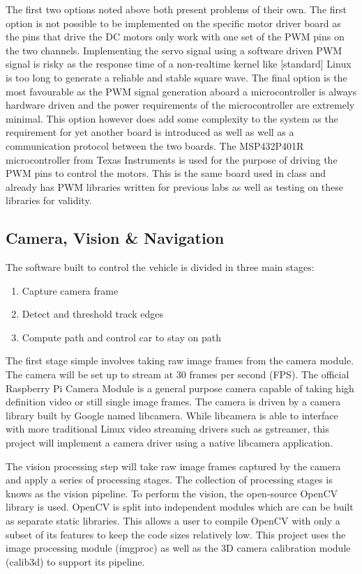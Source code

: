 \documentclass{article}
\begin{document}
The first two options noted above both present problems of their own. The first option
is not possible to be implemented on the specific motor driver board as the pins that
drive the DC motors only work with one set of the PWM pins on the two channels.
Implementing the servo signal using a software driven PWM signal is risky as the response
time of a non-realtime kernel like [standard] Linux is too long to generate a reliable
and stable square wave. The final option is the most favourable as the PWM signal
generation aboard a microcontroller is always hardware driven and the power requirements
of the microcontroller are extremely minimal. This option however does add some
complexity to the system as the requirement for yet another board is introduced as well
as well as a communication protocol between the two boards. The MSP432P401R microcontroller
from Texas Instruments is used for the purpose of driving the PWM pins to control the
motors. This is the same board used in class and already has PWM libraries written
for previous labs as well as testing on these libraries for validity.

\subsection{Camera, Vision \& Navigation}

The software built to control the vehicle is divided in three main stages:

\begin{enumerate}
\item Capture camera frame
\item Detect and threshold track edges
\item Compute path and control car to stay on path
\end{enumerate}

The first stage simple involves taking raw image frames from the camera module.
The camera will be set up to stream at 30 frames per second (FPS).
The official Raspberry Pi Camera Module is a general purpose camera capable of taking
high definition video or still single image frames. The camera is driven by a camera
library built by Google named libcamera. While libcamera is able to interface with
more traditional Linux video streaming drivers such as gstreamer, this project will
implement a camera driver using a native libcamera application.

The vision processing step will take raw image frames captured by the camera and apply a
series of processing stages. The collection of processing stages is knows as the vision
pipeline. To perform the vision, the open-source OpenCV library is
used. OpenCV is split into independent modules which are can be built as separate
static libraries. This allows a user to compile OpenCV with only a subset of its
features to keep the code sizes relatively low. This project uses the image processing
module (imgproc) as well as the 3D camera calibration module (calib3d) to support
its pipeline.
\end{document}
